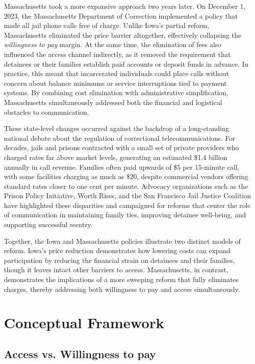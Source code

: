 \documentclass[12pt, a4paper]{article}
\begin{document}
Massachusetts took a more expansive approach two years later. On December 1, 2023, the Massachusetts Department of Correction implemented a policy that made all jail phone calls free of charge. Unlike Iowa's partial reform, Massachusetts eliminated the price barrier altogether, effectively collapsing the \textit{willingness to pay} margin. At the same time, the elimination of fees also influenced the access channel indirectly, as it removed the requirement that detainees or their families establish paid accounts or deposit funds in advance. In practice, this meant that incarcerated individuals could place calls without concern about balance minimums or service interruptions tied to payment systems. By combining cost elimination with administrative simplification, Massachusetts simultaneously addressed both the financial and logistical obstacles to communication.

These state-level changes occurred against the backdrop of a long-standing national debate about the regulation of correctional telecommunications. For decades, jails and prisons contracted with a small set of private providers who charged rates far above market levels, generating an estimated \$1.4 billion annually in call revenue. Families often paid upwards of \$5 per 15-minute call, with some facilities charging as much as \$20, despite commercial vendors offering standard rates closer to one cent per minute. Advocacy organizations such as the Prison Policy Initiative, Worth Rises, and the San Francisco Jail Justice Coalition have highlighted these disparities and campaigned for reforms that center the role of communication in maintaining family ties, improving detainee well-being, and supporting successful reentry.

Together, the Iowa and Massachusetts policies illustrate two distinct models of reform. Iowa's price reduction demonstrates how lowering costs can expand participation by reducing the financial strain on detainees and their families, though it leaves intact other barriers to access. Massachusetts, in contrast, demonstrates the implications of a more sweeping reform that fully eliminates charges, thereby addressing both willingness to pay and access simultaneously. 

\section{Conceptual Framework}

\subsection{Access vs. Willingness to pay}
\end{document}
